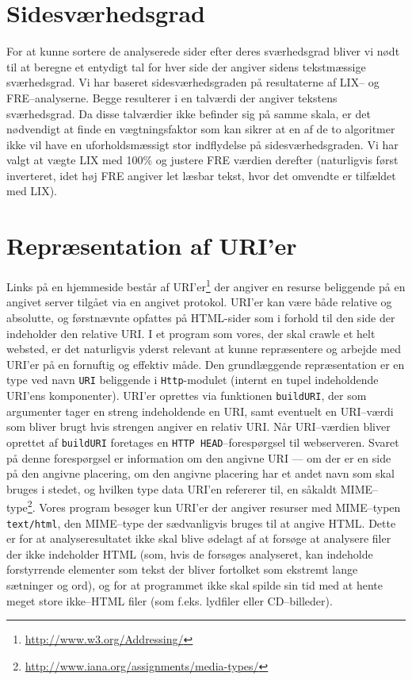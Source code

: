 \documentclass[a4paper,oneside]{memoir}
\begin{document}
\section{Sidesværhedsgrad}
For at kunne sortere de analyserede sider efter deres sværhedsgrad
bliver vi nødt til at beregne et entydigt tal for hver side der
angiver sidens tekstmæssige sværhedsgrad. Vi har baseret
sidesværhedsgraden på resultaterne af LIX-- og FRE--analyserne. Begge
resulterer i en talværdi der angiver tekstens sværhedsgrad. Da disse
talværdier ikke befinder sig på samme skala, er det nødvendigt at
finde en vægtningsfaktor som kan sikrer at en af de to algoritmer ikke
vil have en uforholdsmæssigt stor indflydelse på
sidesværhedsgraden. Vi har valgt at vægte LIX med 100\% og justere FRE
værdien derefter (naturligvis først inverteret, idet høj FRE angiver
let læsbar tekst, hvor det omvendte er tilfældet med LIX).

\section{Repræsentation af URI'er}
\label{uriimpl}
Links på en hjemmeside består af
URI'er\footnote{\url{http://www.w3.org/Addressing/}} der angiver en
resurse beliggende på en angivet server tilgået via en angivet
protokol. URI'er kan være både relative og absolutte, og førstnævnte
opfattes på HTML-sider som i forhold til den side der indeholder den
relative URI. I et program som vores, der skal crawle et helt websted,
er det naturligvis yderst relevant at kunne repræsentere og arbejde
med URI'er på en fornuftig og effektiv måde. Den grundlæggende
repræsentation er en type ved navn \texttt{URI} beliggende i
\texttt{Http}-modulet (internt en tupel indeholdende URI'ens
komponenter). URI'er oprettes via funktionen \texttt{buildURI}, der som
argumenter tager en streng indeholdende en URI, samt eventuelt en
URI--værdi som bliver brugt hvis strengen angiver en relativ URI. Når
URI--værdien bliver oprettet af \texttt{buildURI} foretages en
\texttt{HTTP HEAD}--forespørgsel til webserveren. Svaret på denne
forespørgsel er information om den angivne URI --- om der er en side
på den angivne placering, om den angivne placering har et andet navn
som skal bruges i stedet, og hvilken type data URI'en refererer til,
en såkaldt
MIME--type\footnote{\url{http://www.iana.org/assignments/media-types/}}. Vores
program besøger kun URI'er der angiver resurser med MIME--typen
\texttt{text/html}, den MIME--type der sædvanligvis bruges til at
angive HTML. Dette er for at analyseresultatet ikke skal blive ødelagt
af at forsøge at analysere filer der ikke indeholder HTML (som, hvis
de forsøges analyseret, kan indeholde forstyrrende elementer som tekst
der bliver fortolket som ekstremt lange sætninger og ord), og for at
programmet ikke skal spilde sin tid med at hente meget store
ikke--HTML filer (som f.eks. lydfiler eller CD--billeder).
\end{document}
